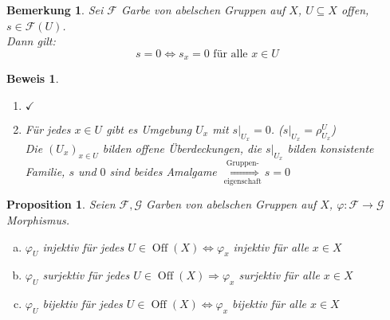 \documentclass[a4paper,12pt]{report}
\theoremstyle{break}
\newtheorem{Bem}[Def]{Bemerkung}
\newtheorem{Prop}[Def]{Proposition}
\theoremstyle{nonumberbreak}
\newtheorem{bew}{Beweis}
\theoremstyle{nonumberplain}
\newcommand{\quot}[1]{\textrm{\glqq}{#1}\textrm{\grqq}}
\newenvironment{twosidedproof}{\begin{enumerate}[\quot{$\Rightarrow$}:]}{\end{enumerate}}
\newcommand{\proofforward}{\item[\quot{$\Rightarrow$}:]}
\newcommand{\proofreverse}{\item[\quot{$\Leftarrow$}:]}
\DeclareMathOperator{\Off}{Off}
\newcommand{\calF}{\mathcal{F}}
\newcommand{\calG}{\mathcal{G}}
\begin{document}

\begin{Bem}\label{1.7}
Sei $\calF$ Garbe von abelschen Gruppen auf $X$, $U\subseteq X$ offen, $s\in \calF(U)$.\\
Dann gilt:
	\[s=0 \Leftrightarrow s_x = 0 \text{ f\"ur alle } x\in U\]
\end{Bem}

\begin{bew}\begin{twosidedproof}
\proofforward
	$\checkmark$
\proofreverse
	F\"ur jedes $x\in U$ gibt es Umgebung $U_x$ mit $s|_{U_x} = 0$. ($s|_{U_x} = \rho_{U_x}^U$)\\
	Die $(U_x)_{x\in U}$ bilden offene \"Uberdeckungen, die $s|_{U_x}$ bilden konsistente Familie, $s$ und $0$ sind beides Amalgame $\overset{\text{Gruppen-}}{\underset{\text{eigenschaft}}{\Longrightarrow}} s= 0$
\end{twosidedproof}\end{bew}

\begin{Prop}\label{1.8}
Seien $\calF, \calG$ Garben von abelschen Gruppen auf $X$, $\varphi: \calF \to \calG$ Morphismus.
\begin{enumerate}[a)]
\item\label{1.8a}
	$\varphi_U$ injektiv f\"ur jedes $U\in \Off(X) \Leftrightarrow \varphi_x$ injektiv f\"ur alle $x\in X$
\item
	$\varphi_U$ surjektiv f\"ur jedes $U\in \Off(X) \Rightarrow \varphi_x$ surjektiv f\"ur alle $x\in X$
\item
	$\varphi_U$ bijektiv f\"ur jedes $U\in \Off(X) \Leftrightarrow \varphi_x$ bijektiv f\"ur alle $x\in X$
\end{enumerate}\end{Prop}
\end{document}
